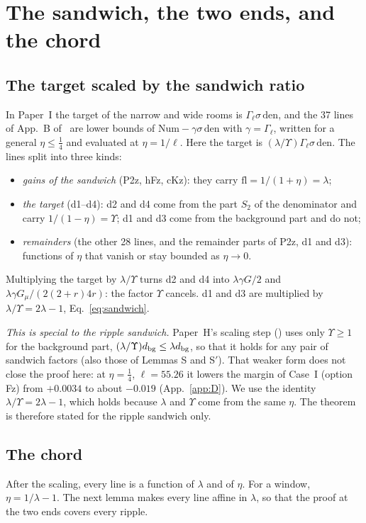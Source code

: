 \section{The sandwich, the two ends, and the chord}
\label{sec:sandwich}

\subsection{The target scaled by the sandwich ratio}
In Paper~I the target of the narrow and wide rooms is $\Gamma_\ell\sigma\,\mathrm{den}$, and the 37 lines of App.~B of~\cite{I} are lower bounds of $\mathrm{Num}-\gamma\sigma\,\mathrm{den}$ with $\gamma=\Gamma_\ell$, written for a general $\eta\le\tfrac14$ and evaluated at $\eta=1/\ell$.
Here the target is $(\lambda/\Upsilon)\Gamma_\ell\sigma\,\mathrm{den}$.
The lines split into three kinds:
\begin{itemize}
\item \emph{gains of the sandwich} (P2z, hFz, cKz): they carry $\mathrm{fl}=1/(1+\eta)=\lambda$;
\item \emph{the target} (d1--d4): d2 and d4 come from the part $S_2$ of the denominator and carry $1/(1-\eta)=\Upsilon$; d1 and d3 come from the background part and do not;
\item \emph{remainders} (the other 28 lines, and the remainder parts of P2z, d1 and d3): functions of $\eta$ that vanish or stay bounded as $\eta\to0$.
\end{itemize}
Multiplying the target by $\lambda/\Upsilon$ turns d2 and d4 into $\lambda\gamma G/2$ and $\lambda\gamma G_\mu/(2(2+r)4r)$: the factor $\Upsilon$ cancels.
d1 and d3 are multiplied by $\lambda/\Upsilon=2\lambda-1$, Eq.~\eqref{eq:sandwich}.

\emph{This is special to the ripple sandwich.}
Paper~H's scaling step () uses only $\Upsilon\ge1$ for the background part, $(\lambda/\Upsilon)d_{\rm bg}\le\lambda d_{\rm bg}$, so that it holds for any pair of sandwich factors (also those of Lemmas S and S$'$).
That weaker form does not close the proof here: at $\eta=\tfrac14$, $\ell=55.26$ it lowers the margin of Case~I (option Fz) from $+0.0034$ to about $-0.019$ (App.~\ref{app:D}).
We use the identity $\lambda/\Upsilon=2\lambda-1$, which holds because $\lambda$ and $\Upsilon$ come from the same $\eta$.
The theorem is therefore stated for the ripple sandwich only.

\subsection{The chord}
After the scaling, every line is a function of $\lambda$ and of $\eta$.
For a window, $\eta=1/\lambda-1$.
The next lemma makes every line affine in $\lambda$, so that the proof at the two ends covers every ripple.

